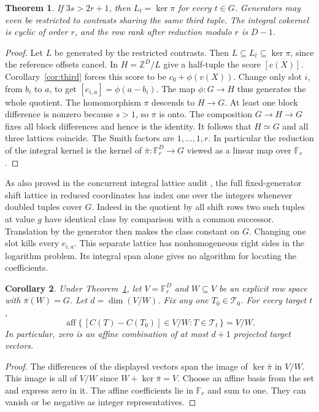\documentclass[11pt]{article}
\newtheorem{theorem}{Theorem}
\newtheorem{corollary}[theorem]{Corollary}
\newcommand{\Z}{\mathbb Z}
\newcommand{\F}{\mathbb F}
\newcommand{\aff}{\operatorname{aff}}
\begin{document}
\begin{theorem}\label{th:lattice}
If $3s>2r+1$, then $L_t=\ker\pi$ for every $t\in G$. Generators may even be restricted to contrasts sharing the same third tuple. The integral cokernel is cyclic of order $r$, and the row rank after reduction modulo $r$ is $D-1$.
\end{theorem}
\begin{proof}
Let $L$ be generated by the restricted contrasts. Then $L\subseteq L_t\subseteq\ker\pi$, since the reference offsets cancel. In $H=\Z^D/L$ give a half-tuple the score $[c(X)]$. Corollary~\ref{cor:third} forces this score to be $c_0+\phi(v(X))$. Change only slot $i$, from $b_i$ to $a$, to get $[e_{i,a}]=\phi(a-b_i)$. The map $\phi:G\to H$ thus generates the whole quotient. The homomorphism $\pi$ descends to $H\to G$. At least one block difference is nonzero because $s>1$, so $\pi$ is onto. The composition $G\to H\to G$ fixes all block differences and hence is the identity. It follows that $H\simeq G$ and all three lattices coincide. The Smith factors are $1,\ldots,1,r$. In particular the reduction of the integral kernel is the kernel of $\bar\pi:\F_r^D\to G$ viewed as a linear map over $\F_r$.
\end{proof}

As also proved in the concurrent integral lattice audit \cite{prnine}, the full fixed-generator shift lattice in reduced coordinates has index one over the integers whenever doubled tuples cover $G$. Indeed in the quotient by all shift rows two such tuples at value $g$ have identical class by comparison with a common successor. Translation by the generator then makes the class constant on $G$. Changing one slot kills every $e_{i,a}$. This separate lattice has nonhomogeneous right sides in the logarithm problem. Its integral span alone gives no algorithm for locating the coefficients.

\begin{corollary}\label{cor:target}
Under Theorem~\ref{th:lattice}, let $V=\F_r^D$ and $W\subseteq V$ be an explicit row space with $\bar\pi(W)=G$. Let $d=\dim(V/W)$. Fix any one $T_0\in\mathcal T_0$. For every target $t$,
\[
 \aff\{\, [C(T)-C(T_0)]\in V/W:T\in\mathcal T_t\,\}=V/W.
\]
In particular, zero is an affine combination of at most $d+1$ projected target vectors.
\end{corollary}
\begin{proof}
The differences of the displayed vectors span the image of $\ker\bar\pi$ in $V/W$. This image is all of $V/W$ since $W+\ker\bar\pi=V$. Choose an affine basis from the set and express zero in it. The affine coefficients lie in $\F_r$ and sum to one. They can vanish or be negative as integer representatives.
\end{proof}
\end{document}
